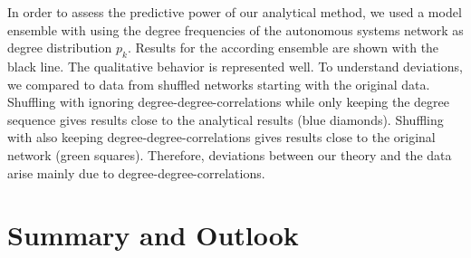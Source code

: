 \documentclass[aps, pre, twocolumn, a4paper, floatfix]{revtex4}
\begin{document}
In order to assess the predictive power of our analytical method, we used a model ensemble with 
using the degree frequencies of the autonomous systems network as degree distribution $p_k$. 
Results for the according ensemble are shown with the black line. The qualitative 
behavior is represented well. To understand deviations, we compared to data from shuffled networks 
starting with the original data. Shuffling with ignoring degree-degree-correlations while only 
keeping the degree sequence gives results close to the analytical results (blue diamonds). 
Shuffling with also keeping degree-degree-correlations gives results close to the original network 
(green squares). 
Therefore, deviations between our theory and the data arise mainly due to degree-degree-correlations. 












\section{Summary and Outlook}










\end{document}
